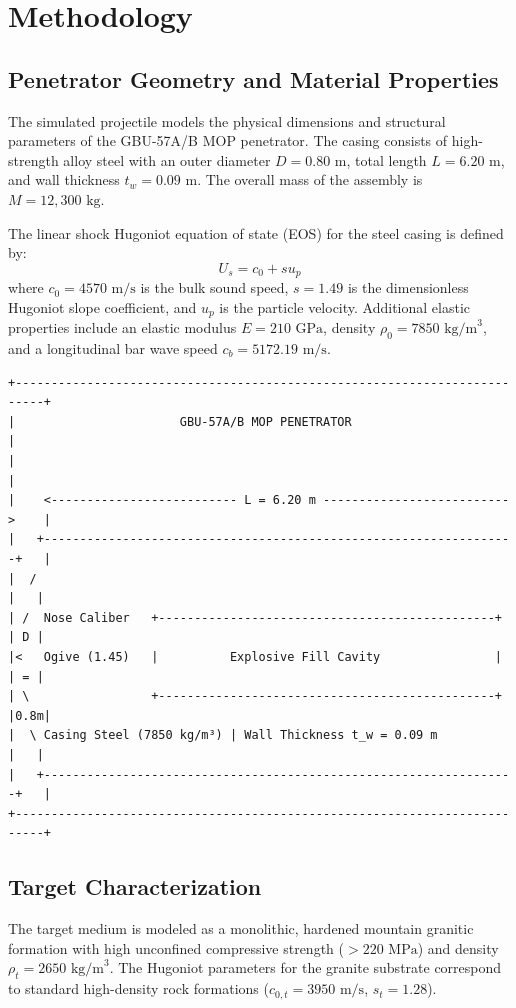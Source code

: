 \documentclass[11pt,a4paper]{article}
\begin{document}
\section{Methodology}

\subsection{Penetrator Geometry and Material Properties}
The simulated projectile models the physical dimensions and structural parameters of the GBU-57A/B MOP penetrator. The casing consists of high-strength alloy steel with an outer diameter $D = 0.80\text{ m}$, total length $L = 6.20\text{ m}$, and wall thickness $t_w = 0.09\text{ m}$. The overall mass of the assembly is $M = 12,300\text{ kg}$.

The linear shock Hugoniot equation of state (EOS) for the steel casing is defined by:
\begin{equation}
U_s = c_0 + s u_p
\end{equation}
where $c_0 = 4570\text{ m/s}$ is the bulk sound speed, $s = 1.49$ is the dimensionless Hugoniot slope coefficient, and $u_p$ is the particle velocity. Additional elastic properties include an elastic modulus $E = 210\text{ GPa}$, density $\rho_0 = 7850\text{ kg/m}^3$, and a longitudinal bar wave speed $c_b = 5172.19\text{ m/s}$.

\begin{verbatim}
+--------------------------------------------------------------------------+
|                       GBU-57A/B MOP PENETRATOR                           |
|                                                                          |
|    <-------------------------- L = 6.20 m -------------------------->    |
|   +------------------------------------------------------------------+   |
|  /                                                                   |   |
| /  Nose Caliber   +-----------------------------------------------+  | D |
|<   Ogive (1.45)   |          Explosive Fill Cavity                |  | = |
| \                 +-----------------------------------------------+  |0.8m|
|  \ Casing Steel (7850 kg/m³) | Wall Thickness t_w = 0.09 m           |   |
|   +------------------------------------------------------------------+   |
+--------------------------------------------------------------------------+
\end{verbatim}

\subsection{Target Characterization}
The target medium is modeled as a monolithic, hardened mountain granitic formation with high unconfined compressive strength ($> 220\text{ MPa}$) and density $\rho_t = 2650\text{ kg/m}^3$. The Hugoniot parameters for the granite substrate correspond to standard high-density rock formations ($c_{0,t} = 3950\text{ m/s}$, $s_t = 1.28$).
\end{document}
